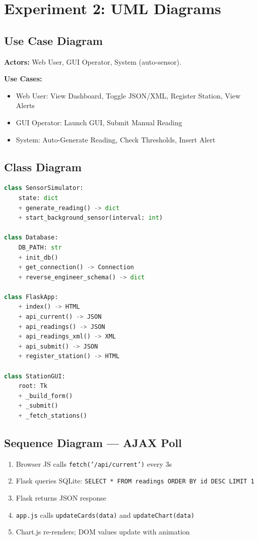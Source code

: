 \documentclass[12pt,a4paper]{article}
\begin{document}
\section{Experiment 2: UML Diagrams}

\subsection{Use Case Diagram}
\textbf{Actors:} Web User, GUI Operator, System (auto-sensor).

\textbf{Use Cases:}
\begin{itemize}
  \item Web User: View Dashboard, Toggle JSON/XML, Register Station, View Alerts
  \item GUI Operator: Launch GUI, Submit Manual Reading
  \item System: Auto-Generate Reading, Check Thresholds, Insert Alert
\end{itemize}

\subsection{Class Diagram}
\begin{lstlisting}[language=Python, caption=Class Structure]
class SensorSimulator:
    state: dict
    + generate_reading() -> dict
    + start_background_sensor(interval: int)

class Database:
    DB_PATH: str
    + init_db()
    + get_connection() -> Connection
    + reverse_engineer_schema() -> dict

class FlaskApp:
    + index() -> HTML
    + api_current() -> JSON
    + api_readings() -> JSON
    + api_readings_xml() -> XML
    + api_submit() -> JSON
    + register_station() -> HTML

class StationGUI:
    root: Tk
    + _build_form()
    + _submit()
    + _fetch_stations()
\end{lstlisting}

\subsection{Sequence Diagram — AJAX Poll}
\begin{enumerate}
  \item Browser JS calls \texttt{fetch('/api/current')} every 3s
  \item Flask queries SQLite: \texttt{SELECT * FROM readings ORDER BY id DESC LIMIT 1}
  \item Flask returns JSON response
  \item \texttt{app.js} calls \texttt{updateCards(data)} and \texttt{updateChart(data)}
  \item Chart.js re-renders; DOM values update with animation
\end{enumerate}
\end{document}
